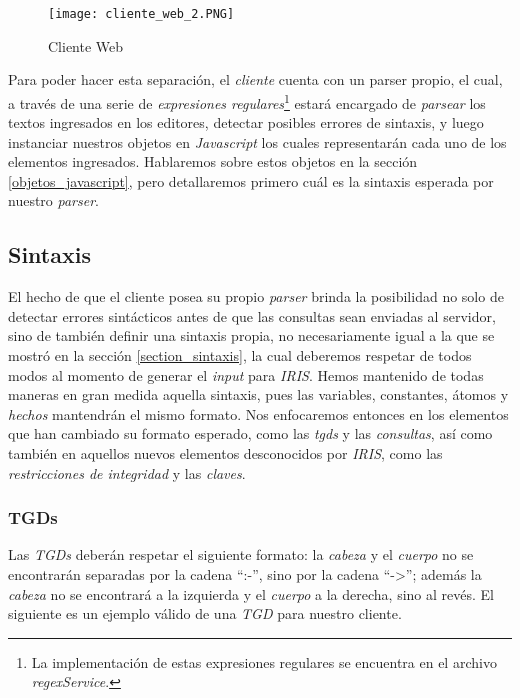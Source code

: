 \documentclass[11pt,a4paper,twoside]{tesis}
\begin{document}
\begin{figure}[ht]
    \texttt{[image: cliente\_web\_2.PNG]}
    \centering
    \caption{Cliente Web}
    \label{fig:cliente_web_2}
\end{figure}

 
Para poder hacer esta separación, el \textit{cliente} cuenta con un parser propio, el cual, a través de una serie de \textit{expresiones regulares}\footnote{La implementación de estas expresiones regulares se encuentra en el archivo \textit{regexService}.}  estará encargado de \textit{parsear} los textos ingresados en los editores, detectar posibles errores de sintaxis, y luego instanciar nuestros objetos en \textit{Javascript} los cuales representarán cada uno de los elementos ingresados. Hablaremos sobre estos objetos en la sección \ref{objetos_javascript}, pero detallaremos primero cuál es la sintaxis esperada por nuestro \textit{parser}.

\subsection{Sintaxis}

El hecho de que el cliente posea su propio \textit{parser} brinda la posibilidad no solo de detectar errores sintácticos antes de que las consultas sean enviadas al servidor, sino de también definir una sintaxis propia, no necesariamente igual a la que se mostró en la sección \ref{section_sintaxis}, la cual deberemos respetar de todos modos al momento de generar el \textit{input} para \textit{IRIS}. Hemos mantenido de todas maneras en gran medida aquella sintaxis, pues las variables, constantes, átomos y \textit{hechos} mantendrán el mismo formato. Nos enfocaremos entonces en los elementos que han cambiado su formato esperado, como las \textit{tgds} y las \textit{consultas}, así como también en aquellos nuevos elementos desconocidos por \textit{IRIS}, como las \textit{restricciones de integridad} y las \textit{claves}.

\subsubsection{TGDs}

Las \textit{TGDs} deberán respetar el siguiente formato: la \textit{cabeza} y el \textit{cuerpo} no se encontrarán separadas por la cadena ``:-'', sino por la cadena ``->''; además la \textit{cabeza} no se encontrará a la izquierda y el \textit{cuerpo} a la derecha, sino al revés. El siguiente es un ejemplo válido de una \textit{TGD} para nuestro cliente.
\end{document}
